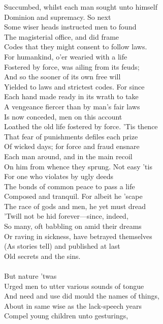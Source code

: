 Succumbed, whilst each man sought unto himself\\
Dominion and supremacy. So next\\
Some wiser heads instructed men to found\\
The magisterial office, and did frame\\
Codes that they might consent to follow laws.\\
For humankind, o'er wearied with a life\\
Fostered by force, was ailing from its feuds;\\
And so the sooner of its own free will\\
Yielded to laws and strictest codes. For since\\
Each hand made ready in its wrath to take\\
A vengeance fiercer than by man's fair laws\\
Is now conceded, men on this account\\
Loathed the old life fostered by force. 'Tis thence\\
That fear of punishments defiles each prize\\
Of wicked days; for force and fraud ensnare\\
Each man around, and in the main recoil\\
On him from whence they sprung. Not easy 'tis\\
For one who violates by ugly deeds\\
The bonds of common peace to pass a life\\
Composed and tranquil. For albeit he 'scape\\
The race of gods and men, he yet must dread\\
'Twill not be hid forever—since, indeed,\\
So many, oft babbling on amid their dreams\\
Or raving in sickness, have betrayed themselves\\
(As stories tell) and published at last\\
Old secrets and the sins.\\
\\
But nature 'twas\\
Urged men to utter various sounds of tongue\\
And need and use did mould the names of things,\\
About in same wise as the lack-speech years\\
Compel young children unto gesturings,\\
